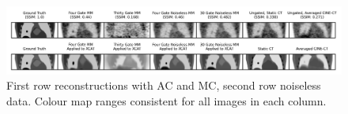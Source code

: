 \documentclass[portrait, color=UCLburgundy, margin=1cm]{uclposter}
\begin{document}
    \begin{figure}[H]
        \centering
        
        \includegraphics[width=1.0\linewidth]{visual_analysis.png}
        
        \begin{highlightbox}[UCLlightblue]
            \captionsetup{singlelinecheck=false, justification=centering}
            \caption{First row reconstructions with \acrshort{AC} and \gls{MC}, second row noiseless data. Colour map ranges consistent for all images in each column.}
        \end{highlightbox}
        
        \label{fig:visual_analysis}
    \end{figure}
    
\end{document}
